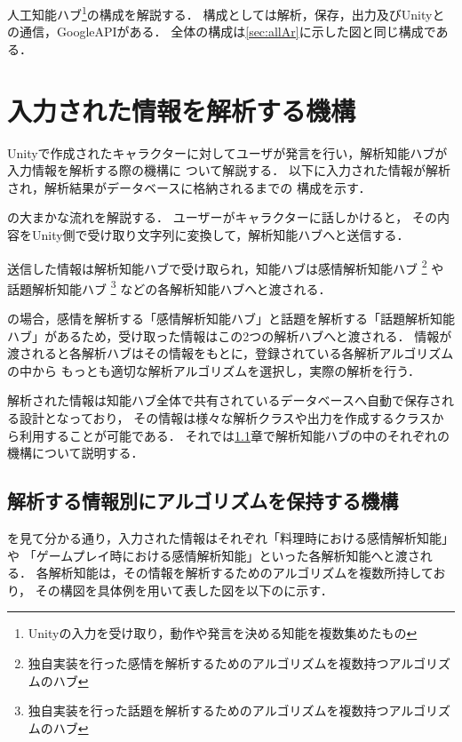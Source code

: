 人工知能ハブ\footnote{Unityの入力を受け取り，動作や発言を決める知能を複数集めたもの}の構成を解説する．
構成としては解析，保存，出力及びUnityとの通信，GoogleAPIがある．
全体の構成は\ref{sec:allAr}に示した図と同じ構成である．

\section{入力された情報を解析する機構}
Unityで作成されたキャラクターに対してユーザが発言を行い，解析知能ハブが入力情報を解析する際の機構に
ついて解説する．
以下に入力された情報が解析され，解析結果がデータベースに格納されるまでの
構成を示す．


の大まかな流れを解説する．
ユーザーがキャラクターに話しかけると，
その内容をUnity側で受け取り文字列に変換して，解析知能ハブへと送信する．

送信した情報は解析知能ハブで受け取られ，知能ハブは感情解析知能ハブ
\footnote{独自実装を行った感情を解析するためのアルゴリズムを複数持つアルゴリズムのハブ}
や話題解析知能ハブ
\footnote{独自実装を行った話題を解析するためのアルゴリズムを複数持つアルゴリズムのハブ}
などの各解析知能ハブへと渡される．

の場合，感情を解析する「感情解析知能ハブ」と話題を解析する「話題解析知能
ハブ」があるため，受け取った情報はこの2つの解析ハブへと渡される．
情報が渡されると各解析ハブはその情報をもとに，登録されている各解析アルゴリズムの中から
もっとも適切な解析アルゴリズムを選択し，実際の解析を行う．

解析された情報は知能ハブ全体で共有されているデータベースへ自動で保存される設計となっており，
その情報は様々な解析クラスや出力を作成するクラスから利用することが可能である．
それでは\ref{sec:ika}章で解析知能ハブの中のそれぞれの機構について説明する．

\subsection{解析する情報別にアルゴリズムを保持する機構}\label{sec:ika}
を見て分かる通り，入力された情報はそれぞれ「料理時における感情解析知能」や
「ゲームプレイ時における感情解析知能」といった各解析知能へと渡される．
各解析知能は，その情報を解析するためのアルゴリズムを複数所持しており，
その構図を具体例を用いて表した図を以下のに示す．


